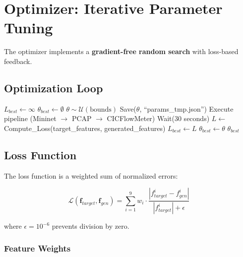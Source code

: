 \documentclass[11pt,a4paper]{article}
\begin{document}
\section{Optimizer: Iterative Parameter Tuning}

The optimizer implements a \textbf{gradient-free random search} with loss-based feedback.

\subsection{Optimization Loop}

\begin{algorithm}[H]
\caption{Parameter Optimization}
\begin{algorithmic}
\STATE $L_{best} \leftarrow \infty$
\STATE $\theta_{best} \leftarrow \emptyset$
    \STATE $\theta \sim \mathcal{U}(\text{bounds})$ 
    \STATE Save($\theta$, ``params\_tmp.json'')
    \STATE Execute pipeline (Mininet $\rightarrow$ PCAP $\rightarrow$ CICFlowMeter)
    \STATE Wait(30 seconds)
    \STATE $L \leftarrow$ Compute\_Loss(target\_features, generated\_features)
        \STATE $L_{best} \leftarrow L$
        \STATE $\theta_{best} \leftarrow \theta$
    \ENDIF
\ENDFOR
\RETURN $\theta_{best}$
\end{algorithmic}
\end{algorithm}

\subsection{Loss Function}

The loss function is a weighted sum of normalized errors:

\begin{equation}
\mathcal{L}(\mathbf{f}_{target}, \mathbf{f}_{gen}) = \sum_{i=1}^{9} w_i \cdot \frac{|f_{target}^i - f_{gen}^i|}{|f_{target}^i| + \epsilon}
\end{equation}

where $\epsilon = 10^{-6}$ prevents division by zero.

\subsubsection{Feature Weights}
\end{document}
